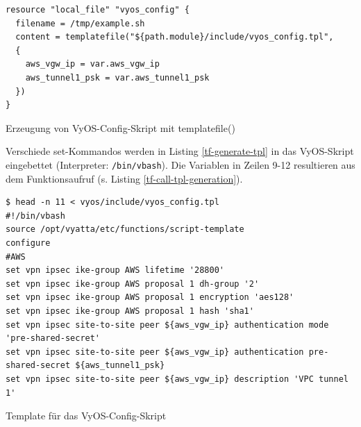 \begin{listing}[h]
\begin{verbatim}
resource "local_file" "vyos_config" {
  filename = /tmp/example.sh
  content = templatefile("${path.module}/include/vyos_config.tpl",
  {
    aws_vgw_ip = var.aws_vgw_ip
    aws_tunnel1_psk = var.aws_tunnel1_psk
  })
}

\end{verbatim}
\caption{Erzeugung von VyOS-Config-Skript mit templatefile()}
\label{tf-call-tpl-generation}
\end{listing}\FloatBarrier
Verschiede set-Kommandos werden in Listing \ref{tf-generate-tpl} in das VyOS-Skript eingebettet (Interpreter: \texttt{/bin/vbash}). Die Variablen in Zeilen 9-12 resultieren aus dem Funktionsaufruf (s. Listing \ref{tf-call-tpl-generation}).
\begin{listing}[h]
\begin{verbatim}
$ head -n 11 < vyos/include/vyos_config.tpl
#!/bin/vbash
source /opt/vyatta/etc/functions/script-template
configure
#AWS
set vpn ipsec ike-group AWS lifetime '28800'
set vpn ipsec ike-group AWS proposal 1 dh-group '2'
set vpn ipsec ike-group AWS proposal 1 encryption 'aes128'
set vpn ipsec ike-group AWS proposal 1 hash 'sha1'
set vpn ipsec site-to-site peer ${aws_vgw_ip} authentication mode 'pre-shared-secret'
set vpn ipsec site-to-site peer ${aws_vgw_ip} authentication pre-shared-secret ${aws_tunnel1_psk}
set vpn ipsec site-to-site peer ${aws_vgw_ip} description 'VPC tunnel 1'

\end{verbatim}
\caption{Template für das VyOS-Config-Skript}
\label{tf-generate-tpl}
\end{listing}\FloatBarrier


